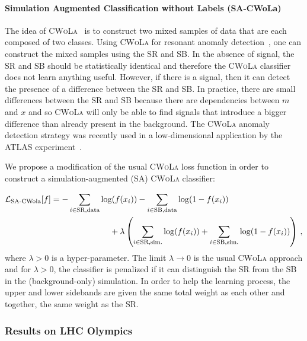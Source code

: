 \documentclass[a4paper,11pt]{article}
\begin{document}
\paragraph{Simulation Augmented Classification without Labels (SA-CWoLa)}

The idea of \textsc{CWoLa}~\cite{Metodiev:2017vrx} is to construct two mixed samples of data that are each composed of two classes.  Using \textsc{CWoLa} for resonant anomaly detection~\cite{Collins:2018epr,Collins:2019jip}, one can construct the mixed samples using the SR and SB.  In the absence of signal, the SR and SB should be statistically identical and therefore the \textsc{CWoLa} classifier does not learn anything useful.  However, if there is a signal, then it can detect the presence of a difference between the SR and SB.  In practice, there are small differences between the SR and SB because there are dependencies between $m$ and $x$ and so \textsc{CWoLa} will only be able to find signals that introduce a bigger difference than already present in the background.  The \textsc{CWoLa} anomaly detection strategy was recently used in a low-dimensional application by the ATLAS experiment~\cite{collaboration2020dijet}.

We propose a modification of the usual \textsc{CWoLa} loss function in order to construct a simulation-augmented (SA) \textsc{CWoLa} classifier:

\begin{align}\nonumber
\mathcal{L}_\text{SA-CWola}[f]&=-\sum_{i\in\text{SR,data}}\log(f(x_i))-\sum_{i\in\text{SB,data}}\log(1-f(x_i))\\
\label{eq:sacwola}
&\hspace{25mm}+\lambda\left(\sum_{i\in\text{SR,sim.}}\log(f(x_i))+\sum_{i\in\text{SB,sim.}}\log(1-f(x_i))\right)\,,
\end{align}
where $\lambda > 0$ is a hyper-parameter.  The limit $\lambda\rightarrow 0$ is the usual \textsc{CWoLa} approach and for $\lambda > 0$, the classifier is penalized if it can distinguish the SR from the SB in the (background-only) simulation.  In order to help the learning process, the upper and lower sidebands are given the same total weight as each other and together, the same weight as the SR.

\subsubsection{Results on LHC Olympics}
\end{document}
